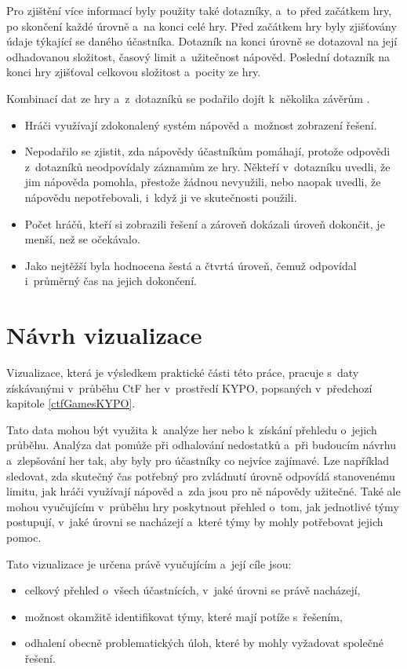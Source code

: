 \documentclass[
  digital, %
  oneside, %
  table,   %
  nolof,     %
  nolot,     %
]{fithesis3}
\begin{document}
Pro zjištění více informací byly použity také dotazníky, a~to před začátkem hry, po skončení každé úrovně a~na konci celé hry. Před začátkem hry byly zjišťovány údaje týkající se daného účastníka. Dotazník na konci úrovně se dotazoval na její odhadovanou složitost, časový limit a~užitečnost nápověd. Poslední dotazník na konci hry zjišťoval celkovou složitost a~pocity ze hry.\par
Kombinací dat ze hry a~z~dotazníků se podařilo dojít k~několika závěrům \cite{ctfDesign}.
\begin{itemize}
  \item Hráči využívají zdokonalený systém nápověd a~možnost zobrazení řešení.
  \item Nepodařilo se zjistit, zda nápovědy účastníkům pomáhají, protože odpovědi z~dotazníků neodpovídaly záznamům ze hry. Někteří v~dotazníku uvedli, že jim nápověda pomohla, přestože žádnou nevyužili, nebo naopak uvedli, že nápovědu nepotřebovali, i~když ji ve skutečnosti použili.
  \item Počet hráčů, kteří si zobrazili řešení a zároveň dokázali úroveň dokončit, je menší, než se očekávalo.
  \item Jako nejtěžší byla hodnocena šestá a čtvrtá úroveň, čemuž odpovídal i~průměrný čas na jejich dokončení.
\end{itemize}

\chapter{Návrh vizualizace}
Vizualizace, která je výsledkem praktické části této práce, pracuje s~daty získávanými v~průběhu CtF her v~prostředí KYPO, popsaných v~předchozí kapitole \ref{ctfGamesKYPO}.\par
Tato data mohou být využita k~analýze her nebo k~získání přehledu o~jejich průběhu. Analýza dat pomůže při odhalování nedostatků a~při budoucím návrhu a~zlepšování her tak, aby byly pro účastníky co nejvíce zajímavé. Lze například sledovat, zda skutečný čas potřebný pro zvládnutí úrovně odpovídá stanovenému limitu, jak hráči využívají nápověd a~zda jsou pro ně nápovědy užitečné. Také ale mohou vyučujícím v~průběhu hry poskytnout přehled o~tom, jak jednotlivé týmy postupují, v~jaké úrovni se nacházejí a~které týmy by mohly potřebovat jejich pomoc.\par
Tato vizualizace je určena právě vyučujícím a~její cíle jsou:
\begin{itemize}
  \item celkový přehled o~všech účastnících, v~jaké úrovni se právě nacházejí,
  \item možnost okamžitě identifikovat týmy, které mají potíže s~řešením,
  \item odhalení obecně problematických úloh, které by mohly vyžadovat společné řešení.
\end{itemize}
\end{document}
